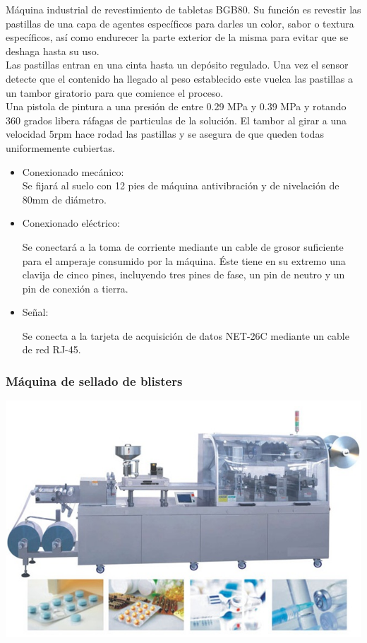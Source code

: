 	Máquina industrial de revestimiento de tabletas BGB80. Su función es revestir las pastillas de una capa de agentes específicos para darles un color, sabor o textura específicos, así como endurecer la parte exterior de la misma para evitar que se deshaga hasta su uso.\\

	Las pastillas entran en una cinta hasta un depósito regulado. Una vez el sensor detecte que el contenido ha llegado al peso establecido este vuelca las pastillas a un tambor giratorio para que comience el proceso.\\

	Una pistola de pintura a una presión de entre 0.29 MPa y 0.39 MPa y rotando 360 grados libera ráfagas de particulas de la solución. El tambor al girar a una velocidad 5rpm hace rodad las pastillas y se asegura de que queden todas uniformemente cubiertas.\\

		\begin{itemize}
				\item{Conexionado mecánico:}\\
				
				Se fijará al suelo con 12 pies de máquina antivibración y de nivelación de 80mm de diámetro.

				\item{Conexionado eléctrico:}

				Se conectará a la toma de corriente mediante un cable de grosor suficiente para el amperaje consumido por la máquina. Éste tiene en su extremo una clavija de cinco pines, incluyendo tres pines de fase, un pin de neutro y un pin de conexión a tierra.  
				
				\item{Señal:}

				Se conecta a la tarjeta de acquisición de datos NET-26C mediante un cable de red RJ-45.
		\end{itemize}

    \newpage

	\subsubsection{Máquina de sellado de blisters }

	\includegraphics[scale=0.5]{Datasheets/5Foto.png}

